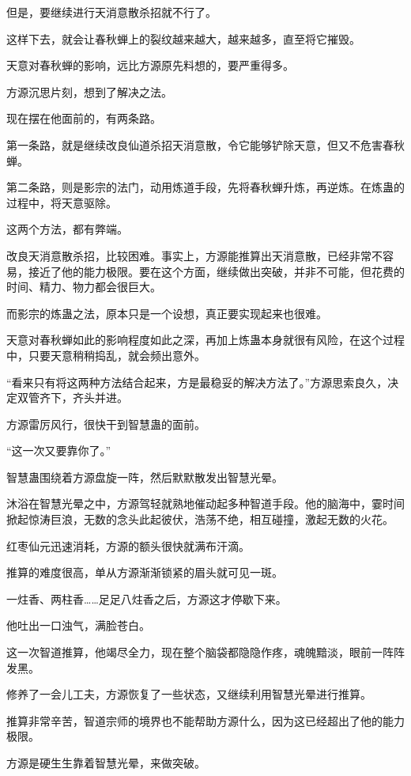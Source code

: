 \begin{this_body}
但是，要继续进行天消意散杀招就不行了。

这样下去，就会让春秋蝉上的裂纹越来越大，越来越多，直至将它摧毁。

天意对春秋蝉的影响，远比方源原先料想的，要严重得多。

方源沉思片刻，想到了解决之法。

现在摆在他面前的，有两条路。

第一条路，就是继续改良仙道杀招天消意散，令它能够铲除天意，但又不危害春秋蝉。

第二条路，则是影宗的法门，动用炼道手段，先将春秋蝉升炼，再逆炼。在炼蛊的过程中，将天意驱除。

这两个方法，都有弊端。

改良天消意散杀招，比较困难。事实上，方源能推算出天消意散，已经非常不容易，接近了他的能力极限。要在这个方面，继续做出突破，并非不可能，但花费的时间、精力、物力都会很巨大。

而影宗的炼蛊之法，原本只是一个设想，真正要实现起来也很难。

天意对春秋蝉如此的影响程度如此之深，再加上炼蛊本身就很有风险，在这个过程中，只要天意稍稍捣乱，就会频出意外。

“看来只有将这两种方法结合起来，方是最稳妥的解决方法了。”方源思索良久，决定双管齐下，齐头并进。

方源雷厉风行，很快干到智慧蛊的面前。

“这一次又要靠你了。”

智慧蛊围绕着方源盘旋一阵，然后默默散发出智慧光晕。

沐浴在智慧光晕之中，方源驾轻就熟地催动起多种智道手段。他的脑海中，霎时间掀起惊涛巨浪，无数的念头此起彼伏，浩荡不绝，相互碰撞，激起无数的火花。

红枣仙元迅速消耗，方源的额头很快就满布汗滴。

推算的难度很高，单从方源渐渐锁紧的眉头就可见一斑。

一炷香、两柱香……足足八炷香之后，方源这才停歇下来。

他吐出一口浊气，满脸苍白。

这一次智道推算，他竭尽全力，现在整个脑袋都隐隐作疼，魂魄黯淡，眼前一阵阵发黑。

修养了一会儿工夫，方源恢复了一些状态，又继续利用智慧光晕进行推算。

推算非常辛苦，智道宗师的境界也不能帮助方源什么，因为这已经超出了他的能力极限。

方源是硬生生靠着智慧光晕，来做突破。


\end{this_body}
